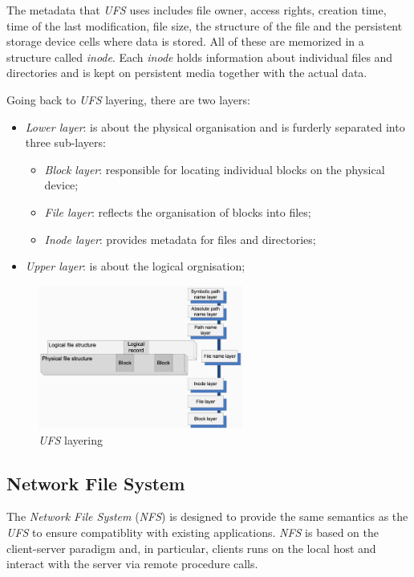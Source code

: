 The metadata that \emph{UFS} uses includes file owner, access rights, creation
time, time of the last modification, file size, the structure of the file and
the persistent storage device cells where data is stored. All of these are
memorized in a structure called \emph{inode}. Each \emph{inode} holds information
about individual files and directories and is kept on persistent media together
with the actual data.

\bigskip\noindent
Going back to \emph{UFS} layering, there are two layers:
\begin{itemize}
    \item \emph{Lower layer}: is about the physical organisation and is furderly
    separated into three sub-layers:
    \begin{itemize}
        \item \emph{Block layer}: responsible for locating individual blocks on
        the physical device;
        \item \emph{File layer}: reflects the organisation of blocks into files;
        \item \emph{Inode layer}: provides metadata for files and directories;
    \end{itemize}
    \item \emph{Upper layer}: is about the logical orgnisation;
\end{itemize}

\newpage
\begin{figure}[ht!]
    \centering
    \includegraphics[width=0.6\textwidth]{images/ufs-layering.png}
    \caption{\emph{UFS} layering}
\end{figure}

\subsection{Network File System}
The \emph{Network File System} (\emph{NFS}) is designed to provide the same
semantics as the \emph{UFS} to ensure compatiblity with existing applications.
\emph{NFS} is based on the client-server paradigm and, in particular, clients
runs on the local host and interact with the server via remote procedure calls.

